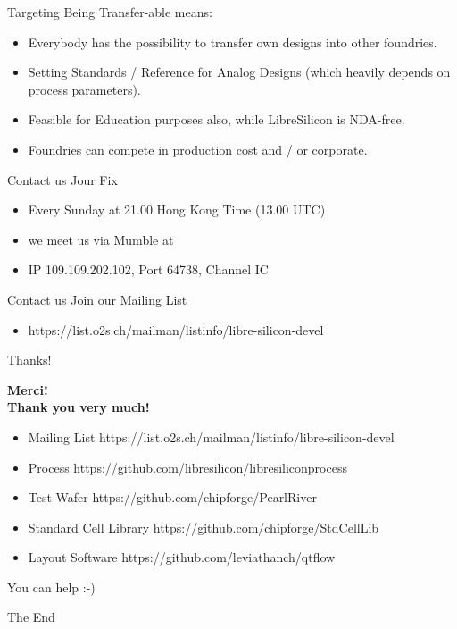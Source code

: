 \documentclass{beamer}
\begin{document}
\begin{frame}{Targeting}
Being Transfer-able means:
\begin{itemize}
\item Everybody has the possibility to transfer own designs into other foundries.
\item Setting Standards / Reference for Analog Designs (which heavily depends on process parameters).
\item Feasible for Education purposes also, while LibreSilicon is NDA-free.
\item Foundries can compete in production cost and / or corporate.
\end{itemize}
\end{frame}

\begin{frame}{Contact us}
Jour Fix
\begin{itemize}
\item Every Sunday at 21.00 Hong Kong Time (13.00 UTC)
\item we meet us via Mumble at
\item IP 109.109.202.102, Port 64738, Channel IC
\end{itemize}
\end{frame}


\begin{frame}{Contact us}
Join our Mailing List
\begin{itemize}
\item https://list.o2s.ch/mailman/listinfo/libre-silicon-devel
\end{itemize}
\end{frame}


\begin{frame}{Thanks!}
	\begin{center}
		\textbf{Merci!} \\
		\textbf{Thank you very much!} \\
	\end{center}
\end{frame}


\begin{frame}
\begin{itemize}
\item Mailing List
https://list.o2s.ch/mailman/listinfo/libre-silicon-devel
\item Process
https://github.com/libresilicon/libresiliconprocess
\item Test Wafer
https://github.com/chipforge/PearlRiver
\item Standard Cell Library
https://github.com/chipforge/StdCellLib
\item Layout Software
https://github.com/leviathanch/qtflow
\end{itemize}
\huge{\centerline{You can help :-)}}
\end{frame}


\begin{frame}
\huge{\centerline{The End}}
\end{frame}
\end{document}
